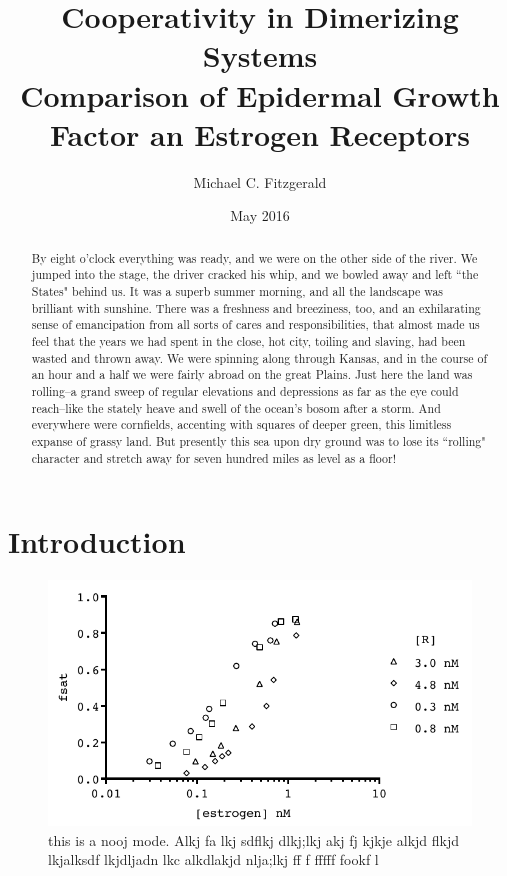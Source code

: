 \documentclass[12pt, titlepage]{article}
\begin{document}
\title{\textbf{\LARGE{Cooperativity in Dimerizing Systems}} \\[0.5em] \normalsize{Comparison of Epidermal Growth Factor an Estrogen Receptors}}
\author{Michael C. Fitzgerald}
\date{May 2016}
\maketitle

\begin{abstract}
By eight o'clock everything was ready, and we were on the other side of
the river.  We jumped into the stage, the driver cracked his whip, and we
bowled away and left ``the States" behind us.  It was a superb summer
morning, and all the landscape was brilliant with sunshine.  There was a
freshness and breeziness, too, and an exhilarating sense of emancipation
from all sorts of cares and responsibilities, that almost made us feel
that the years we had spent in the close, hot city, toiling and slaving,
had been wasted and thrown away.  We were spinning along through Kansas,
and in the course of an hour and a half we were fairly abroad on the
great Plains.  Just here the land was rolling--a grand sweep of regular
elevations and depressions as far as the eye could reach--like the
stately heave and swell of the ocean's bosom after a storm.  And
everywhere were cornfields, accenting with squares of deeper green, this
limitless expanse of grassy land.  But presently this sea upon dry ground
was to lose its ``rolling" character and stretch away for seven hundred
miles as level as a floor!
\end{abstract}

\pagestyle{empty} %
\tableofcontents %
\clearpage %
\pagestyle{plain} %
\setcounter{page}{1} %


\section{Introduction}
\blindmathtrue
\blindtext[2]
\begin{figure}
\centering
\includegraphics{grph4.pdf}
\caption{this is a nooj mode. Alkj fa lkj sdflkj dlkj;lkj akj fj kjkje alkjd flkjd lkjalksdf lkjdljadn lkc alkdlakjd nlja;lkj ff f fffff fookf l}
\end{figure}
\end{document}
